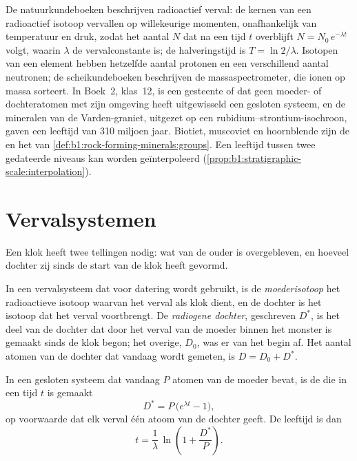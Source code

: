 \begin{recall}
De natuurkundeboeken beschrijven radioactief verval: de kernen van een radioactief isotoop vervallen op willekeurige momenten, onafhankelijk van temperatuur en druk, zodat het aantal $N$ dat na een tijd $t$ overblijft $N = N_0\,e^{-\lambda t}$ volgt, waarin $\lambda$ de vervalconstante is; de halveringstijd is $T = \ln 2/\lambda$. Isotopen van een element hebben hetzelfde aantal protonen en een verschillend aantal neutronen; de scheikundeboeken beschrijven de massaspectrometer, die ionen op massa sorteert. In Boek~2, klas~12, is een gesteente of  dat geen moeder- of dochteratomen met zijn omgeving heeft uitgewisseld een gesloten systeem, en de mineralen van de Varden-graniet, uitgezet op een rubidium--strontium-isochroon, gaven een leeftijd van 310 miljoen jaar. Biotiet, muscoviet en hoornblende zijn de  en het  van \cref{def:b1:rock-forming-minerals:groups}. Een leeftijd tussen twee gedateerde niveaus kan worden geïnterpoleerd (\cref{prop:b1:stratigraphic-scale:interpolation}).
\end{recall}

\section{Vervalsystemen}\label{sec:b1:radiometric-methods:systems}

Een klok heeft twee tellingen nodig: wat van de ouder is overgebleven, en hoeveel dochter zij sinds de start van de klok heeft gevormd.

\begin{definition}\label{def:b1:radiometric-methods:radiogenic}
In een vervalsysteem dat voor datering wordt gebruikt, is de \emph{moederisotoop} het radioactieve isotoop waarvan het verval als klok dient, en de dochter is het isotoop dat het verval voortbrengt. De \emph{radiogene
dochter}, geschreven $D^*$, is het deel van de dochter dat door het verval van de moeder binnen het monster is gemaakt sinds de klok begon; het overige, $D_0$, was er van het begin af. Het aantal atomen van de dochter dat vandaag wordt gemeten, is $D = D_0 + D^*$.
\end{definition}

\begin{proposition}\label{prop:b1:radiometric-methods:growth}
In een gesloten systeem dat vandaag $P$ atomen van de moeder bevat, is de  die in een tijd $t$ is gemaakt
\[
  D^* = P\,\bigl(e^{\lambda t} - 1\bigr),
\]
op voorwaarde dat elk verval één atoom van de dochter geeft. De leeftijd is dan
\[
  t = \frac{1}{\lambda}\,\ln\!\left(1 + \frac{D^*}{P}\right).
\]
\end{proposition}

